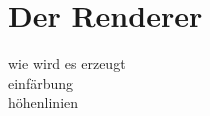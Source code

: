 \section{Der Renderer}
\begin{Spacing}{\mylinespace}

wie wird es erzeugt \\
einfärbung\\
höhenlinien\\


\end{Spacing}
\newpage
\clearpage
